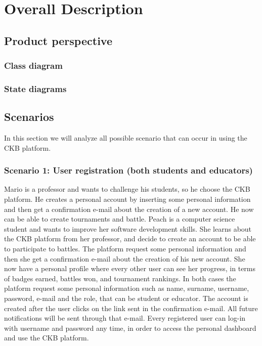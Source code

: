 \chapter{Overall Description}

\section{Product perspective}
\subsection{Class diagram}
\subsection{State diagrams}
\clearpage

\section{Scenarios}
In this section we will analyze all possible scenario that can occur in using the CKB platform.

\subsection{Scenario 1: User registration (both students and educators)}
Mario is a professor and wants to challenge his students, so he choose the CKB platform. He creates a personal account by inserting some personal information and then get a confirmation e-mail about the creation of a new account. He now can be able to create tournaments and battle. \newline
Peach is a computer science student and wants to improve her software development skills. She learns about the CKB platform from her professor, and decide to create an account to be able to participate to battles. The platform request some personal information and then she get a confirmation e-mail about the creation of his new account. She now have a personal profile where every other user can see her progress, in terms of badges earned, battles won, and tournament rankings. \newline
In both cases the platform request some personal information such as name, surname, username, password, e-mail and the role, that can be student or educator. The account is created after the user clicks on the link sent in the confirmation e-mail. All future notifications will be sent through that e-mail. \newline
Every registered user can log-in with username and password any time, in order to access the personal dashboard and use the CKB platform.


